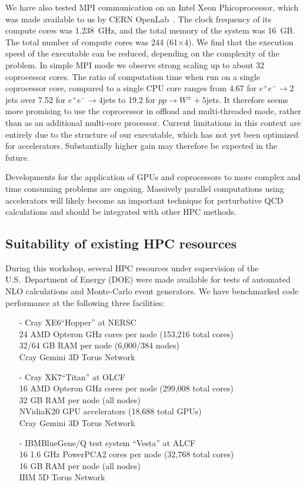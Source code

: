 We have also tested MPI communication on an Intel\registered 
Xeon Phi\trademark coprocessor, which was made available to us by CERN 
OpenLab~\cite{COLA}. The clock frequency of its compute cores was 1.238~GHz, 
and the total memory of the system was 16~GB. The total number of compute 
cores was 244 (61$\times$4). We find that the execution speed of the 
executable can be reduced, depending on the complexity of the problem.
In simple MPI mode we observe strong scaling up to about 32 coprocessor 
cores. The ratio of computation time when run on a single coprocessor 
core, compared to a single CPU core ranges from 4.67 for $e^+e^-\to 2$jets 
over 7.52 for $e^+e^-\to 4$jets to 19.2 for $pp\to W^\pm+5$jets. 
It therefore seems more promising to use the coprocessor in offload 
and multi-threaded mode, rather than as an additional multi-core processor. 
Current limitations in this context are entirely due to the structure 
of our executable, which has not yet been optimized for accelerators. 
Substantially higher gain may therefore be expected in the future.

Developments for the application of GPUs and coprocessors to more complex 
and time consuming problems are ongoing.  Massively parallel computations 
using accelerators will likely become an important technique for perturbative 
QCD calculations and should be integrated with other HPC methods.

\subsection{Suitability of existing HPC resources}
During this workshop, several HPC resources under supervision of the
U.S.\ Department of Energy (DOE) were made available for tests of
automated NLO calculations and Monte-Carlo event generators.  We have
benchmarked code performance at the following three facilities:
\begin{itemize}
\item[-] Cray XE6\trademark ``Hopper'' at NERSC~\cite{NERSC}\\
  24 AMD Opteron GHz cores per node (153,216 total cores)\\
  32/64 GB RAM per node (6,000/384 nodes)\\
  Cray Gemini 3D Torus Network
\item[-] Cray XK7\trademark ``Titan'' at OLCF~\cite{OLCF}\\
  16 AMD Opteron GHz cores per node (299,008 total cores)\\
  32 GB RAM per node (all nodes)\\
  NVidia\registered K20 GPU accelerators (18,688 total GPUs)\\
  Cray Gemini 3D Torus Network
\item[-] IBM\registered BlueGene\registered/Q test system ``Vesta'' at ALCF~\cite{ALCF}\\
  16 1.6 GHz PowerPC\registered A2 cores per node (32,768 total cores)\\
  16 GB RAM per node (all nodes)\\
  IBM 5D Torus Network
\end{itemize}

